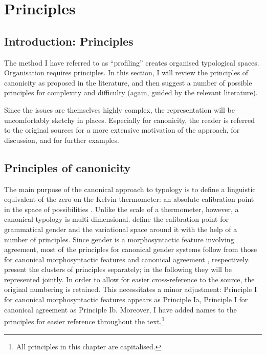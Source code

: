 \documentclass[output=collectionpaper]{langsci/langscibook}
\begin{document}
\section{Principles}
\label{sec:Audr:2}

\subsection{Introduction: Principles}

The method I have referred to as ``profiling'' creates organised typological spaces. Organisation requires principles. In this section, I will review the principles of canonicity as proposed in the literature, and then suggest a number of possible principles for complexity and difficulty (again, guided by the relevant literature).

Since the issues are themselves highly complex, the representation will be uncomfortably sketchy in places. Especially for canonicity, the reader is referred to the original sources for a more extensive motivation of the approach, for discussion, and for further examples.

\subsection{Principles of canonicity}
\label{sec:Audr:2.2}

The main purpose of the canonical approach to typology is to define a linguistic equivalent of the zero on the Kelvin thermometer: an absolute calibration point in the space of possibilities \citep{Fedden2015}. Unlike the scale of a thermometer, however, a canonical typology is multi-dimensional. \citet{Corbett2016} define the calibration point for grammatical gender and the variational space around it with the help of a number of principles. Since gender is a morphosyntactic feature involving agreement, most of the principles for canonical gender systems follow from those for canonical morphosyntactic features \citep{Corbett2012} and canonical agreement \citep{Corbett2006}, respectively. \citet{Corbett2016} present the clusters of principles separately; in the following they will be represented jointly. In order to allow for easier cross-reference to the source, the original numbering is retained. This necessitates a minor adjustment: Principle I for canonical morphosyntactic features appears as Principle Ia, Principle I for canonical agreement as Principle Ib. Moreover, I have added names to the principles for easier reference throughout the text.\footnote{All principles in this chapter are capitalised.}
\end{document}
